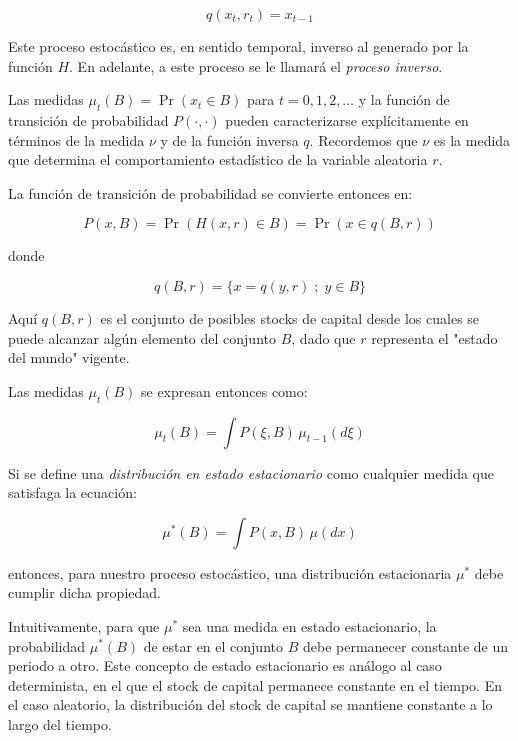 \documentclass[a4paper,12pt]{article}
\begin{document}
		\begin{equation}
q(x_t, r_t) = x_{t-1}
		\end{equation}

Este proceso estocástico es, en sentido temporal, inverso al generado por la función $H$. En adelante, a este proceso se le llamará el \textit{proceso inverso}.

Las medidas $\mu_t(B) = \Pr(x_t \in B)$ para $t = 0, 1, 2, \ldots$ y la función de transición de probabilidad $P(\cdot, \cdot)$ pueden caracterizarse explícitamente en términos de la medida $\nu$ y de la función inversa $q$. Recordemos que $\nu$ es la medida que determina el comportamiento estadístico de la variable aleatoria $r$.

La función de transición de probabilidad se convierte entonces en:

		\begin{equation}
P(x, B) = \Pr(H(x, r) \in B) = \Pr(x \in q(B, r))
		\end{equation}

donde

		\begin{equation}
q(B, r) = \{ x = q(y, r) \; ; \; y \in B \}
		\end{equation}

Aquí $q(B, r)$ es el conjunto de posibles stocks de capital desde los cuales se puede alcanzar algún elemento del conjunto $B$, dado que $r$ representa el "estado del mundo" vigente.

Las medidas $\mu_t(B)$ se expresan entonces como:

		\begin{equation}
\mu_t(B) = \int P(\xi, B) \, \mu_{t-1}(d\xi)
		\end{equation}

Si se define una \textit{distribución en estado estacionario} como cualquier medida que satisfaga la ecuación:

		\begin{equation}
\mu^*(B) = \int P(x, B) \, \mu(dx)
		\end{equation}

entonces, para nuestro proceso estocástico, una distribución estacionaria $\mu^*$ debe cumplir dicha propiedad.

Intuitivamente, para que $\mu^*$ sea una medida en estado estacionario, la probabilidad $\mu^*(B)$ de estar en el conjunto $B$ debe permanecer constante de un periodo a otro. Este concepto de estado estacionario es análogo al caso determinista, en el que el stock de capital permanece constante en el tiempo. En el caso aleatorio, la distribución del stock de capital se mantiene constante a lo largo del tiempo.
\end{document}
